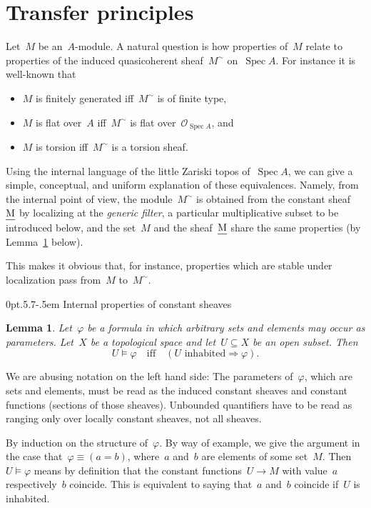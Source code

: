 \documentclass[10pt,reqno,a4paper]{amsbook}
\makeatletter
\theoremstyle{definition}
\theoremstyle{plain}
\newtheorem{lemma}[defn]{Lemma}
\theoremstyle{remark}
\renewcommand{\O}{\mathcal{O}}
\let\oldul\ul
\renewcommand{\ul}[1]{\text{\oldul{$#1$}}}
\DeclareMathOperator{\Spec}{Spec}
\newcommand{\?}{\,{:}\,}
\renewcommand{\_}{\mathpunct{.}\,}
\renewenvironment{proof}[1][\proofname]{\par
  \pushQED{\qed}%
  \normalfont \topsep6\p@\@plus6\p@\relax
  \trivlist
  \item[\hskip\labelsep
        \itshape
    #1\@addpunct{.}]\ignorespaces
}{%
  \popQED\endtrivlist\@endpefalse
}
\def\subsection{\@startsection{subsection}{2}%
  {0pt}{.5\linespacing\@plus.7\linespacing}{-.5em}%
  {\normalfont\bfseries}}
\makeatother
\begin{document}
\section{Transfer principles}
\label{sect:transfer-principles}

Let~$M$ be an~$A$-module. A natural question is how properties of~$M$
relate to properties of the induced quasicoherent sheaf~$M^\sim$
on~$\Spec A$. For instance it is well-known that
\begin{itemize}
\item $M$ is finitely generated iff~$M^\sim$ is of finite type,
\item $M$ is flat over~$A$ iff~$M^\sim$ is flat over~$\O_{\Spec A}$, and
\item $M$ is torsion iff~$M^\sim$ is a torsion sheaf.
\end{itemize}
Using the internal language of the little Zariski topos of~$\Spec A$, we can
give a simple, conceptual, and uniform explanation of these equivalences.
Namely, from the internal point of view, the module~$M^\sim$ is obtained from
the constant sheaf~$\ul{M}$ by localizing at the \emph{generic filter}, a
particular multiplicative subset to be introduced below, and the set~$M$ and
the sheaf~$\ul{M}$ share the same properties (by
Lemma~\ref{lemma:properties-of-constant-sheaves} below).

This makes it obvious that, for instance, properties which are stable under
localization pass from~$M$ to~$M^\sim$.


\subsection{Internal properties of constant sheaves}

\begin{lemma}\label{lemma:properties-of-constant-sheaves}Let~$\varphi$ be a
formula in which arbitrary sets and elements may occur as parameters. Let~$X$
be a topological space and let~$U \subseteq X$ be an open subset. Then
\[ U \models \varphi \quad\text{iff}\quad (\text{$U$ inhabited} \Rightarrow
\varphi). \]
\end{lemma}
We are abusing notation on the left hand side: The parameters
of~$\varphi$, which are sets and elements, must be read as the induced constant
sheaves and constant functions (sections of those sheaves).
Unbounded quantifiers have to be read as ranging only over locally constant
sheaves, not all sheaves.
\begin{proof}By induction on the structure of~$\varphi$. By way of example, we
give the argument in the case that~$\varphi \equiv (a = b)$, where~$a$ and~$b$ are
elements of some set~$M$. Then~$U \models \varphi$ means by definition that the
constant functions~$U \to M$ with value~$a$ respectively~$b$ coincide. This is
equivalent to saying that~$a$ and~$b$ coincide if~$U$ is inhabited.
\end{proof}
\end{document}
